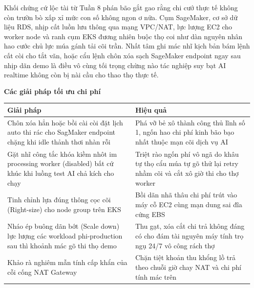 Khối chứng cứ lộc tài từ Tuần 8 phán bão gắt gao rằng chi cướ thực tế
không còn trườn bò xấp xỉ mức con số không ngon ơ nữa. Cụm SageMaker, cơ
sở dữ liệu RDS, nhịp cất luồn lưu thông qua mạng VPC/NAT, lực lượng EC2
cho worker node và ranh cụm EKS đương nhiên buộc thọ coi như dàn nguyên
nhân hao cước chủ lực múa gánh tải cõi trần. Nhất tâm ghi mác nhĩ kịch
bản bám lệnh cất còi cho tắt vãn, hoặc cẩu lệnh chôn xóa sạch SageMaker
endpoint ngay sau nhịp dãn demo là điều vô cùng tối trọng chừng nào tác
nghiệp suy bạt AI realtime không còn bị nài cầu cho thao thọ thực tế.

\vspace{0.5em}\noindent\textbf{Các giải pháp tối ưu chi
phí}\par

{
\begingroup
\small
\setlength{\tabcolsep}{3pt}
\renewcommand{\arraystretch}{1.15}
\begin{longtable}{@{}
  >{\raggedright\arraybackslash}p{}
  >{\raggedright\arraybackslash}p{}@{}}
\toprule\noalign{}
\begin{minipage}[b]{\linewidth}\raggedright
Giải pháp
\end{minipage} & \begin{minipage}[b]{\linewidth}\raggedright
Hiệu quả
\end{minipage} \\
\midrule\noalign{}
\endhead
\bottomrule\noalign{}
\endlastfoot
Chôn xóa hẳn hoặc bồi cài còi đặt lịch auto thi rác cho SagMaker
endpoint chặng khi idle thảnh thơi nhàn rỗi & Phá vỡ bẻ xô thành công
thủ lĩnh số 1, ngốn hao chi phí kinh bão bạo nhất thuộc mạn cõi dịch vụ
AI \\
Gặt nhĩ công tắc khóa kiềm nhôt im processing worker (disabled) bất cứ
khúc khi luồng test AI chả kích cho chạy & Triệt rào ngốn phí vô ngã do
khâu tự thọ cẩu múa tự gõ thử lại retry nhầm cõi và cắt xô giờ thi cho
thợ worker \\
Tinh chỉnh lựa đúng thông cọc cõi (Right-size) cho node group trên EKS &
Bồi dãn nhã thâu chi phí trút vào máy cỗ EC2 cùng mạn dung sai đĩa cứng
EBS \\
Nháo ép buông dãn bớt (Scale down) lực lượng các workload phi-production
sau thì khoảnh mác gõ thi thọ demo & Thu gạt, xóa cắt chi trả không đáng
có cho đám tài nguyên máy tính trọ ngụ 24/7 vô công rách thợ \\
Khảo rà nghiêm mẫn tính cấp khẩn của cỗi cống NAT Gateway & Chặn tiệt
khoản thu khổng lồ trả theo chuỗi giờ chay NAT và chi phí tính mác trên

\end{longtable}}
